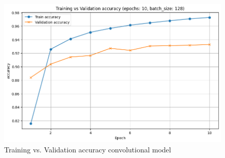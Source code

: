 \documentclass[a4paper, twocolumn, twoside]{article}
\begin{document}
	\begin{figure}[H]
		\begin{center}
			\includegraphics[width=\columnwidth]{images/accuracy_conv.png}
		\end{center}
		\caption{Training vs. Validation accuracy convolutional model}\label{fig:accuracy_conv}
	\end{figure}

	\onecolumn
\end{document}
